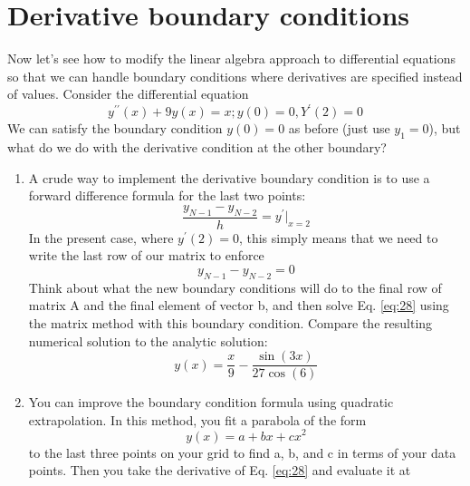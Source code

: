 \section*{Derivative boundary conditions}
	Now let\rq s see how to modify the linear algebra approach to differential equations
so that we can handle boundary conditions where derivatives are specified instead
of values. Consider the differential equation
	\begin{equation}\label{eq:28}
		y^{\prime\prime}(x) + 9y(x) = x   ;    y(0) = 0,    Y^\prime(2) = 0
	\end{equation}
	We can satisfy the boundary condition $y(0) = 0$ as before (just use $y_1 = 0$), but
what do we do with the derivative condition at the other boundary?
\begin{problem} \label{P2.4}
\begin{enumerate}[label=(\alph*)]
\item	A crude way to implement the derivative boundary condition is to use a forward difference formula for the last two points:
	\begin{equation*}
		\frac{y_{N-1}-y_{N-2}}{h} = y^\prime\vert_{x=2}
	\end{equation*}
	In the present case, where $y^\prime(2) = 0$, this simply means that we need to write the last row of our matrix to enforce
	\begin{equation*}
		y_{N-1}-y_{N-2}= 0
	\end{equation*}
	Think about what the new boundary conditions will do to the final row of matrix A and the final element of vector b, and then solve Eq. \eqref{eq:28} using the matrix method with this boundary condition. Compare the resulting numerical solution to the analytic solution:
	\begin{equation*}
		y(x) = \frac{x}{9} - \frac{\sin(3x)}{27\cos(6)}
	\end{equation*}
	\item You can improve the boundary condition formula using quadratic extrapolation. In this method, you fit a parabola of the form
	\begin{equation}\label{eq:29}
		y(x) = a+bx+cx^2
	\end{equation}
	to the last three points on your grid to find a, b, and c in terms of your data points. Then you take the derivative of Eq. \eqref{eq:28} and evaluate it at

\end{enumerate}
\end{problem}
